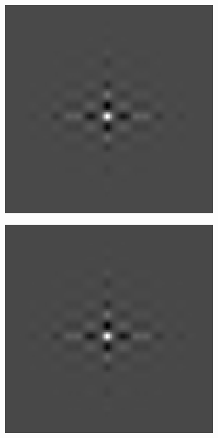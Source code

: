 \begin{figure}[htpb]
\begin{subfigure}{.25\textwidth}
\end{subfigure}
\quad
\begin{subfigure}{.25\textwidth}
\includegraphics[width=1\textwidth]{img/GCRank1sigma0}
\end{subfigure}%
\begin{subfigure}{.25\textwidth}
\includegraphics[width=1\textwidth]{img/GCRank1sigma75}

\end{subfigure}
\end{figure}
